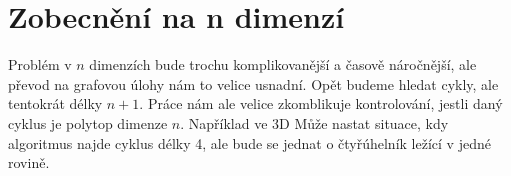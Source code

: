 \chapter{Zobecnění na n dimenzí}
\label{chap:n_dimenzi}

Problém v $n$ dimenzích bude trochu komplikovanější a časově náročnější, ale převod na grafovou úlohy nám to velice usnadní. Opět budeme hledat cykly, ale tentokrát délky $n+1$. Práce nám ale velice zkomblikuje kontrolování, jestli daný cyklus je polytop dimenze $n$. Například ve 3D Může nastat situace, kdy algoritmus najde cyklus délky 4, ale bude se jednat o čtyřúhelník ležící v jedné rovině. 



